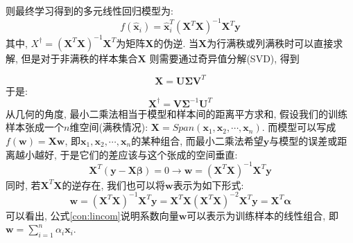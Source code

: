 则最终学习得到的多元线性回归模型为:
\begin{equation}
f\left( \boldsymbol{\hat{x}}_i \right) =\boldsymbol{\hat{x}}_{i}^{T}\left( \mathbf{X}^T\mathbf{X} \right) ^{-1}\mathbf{X}^T\mathbf{y}
\end{equation}
其中, $X^{\dag} = (\mathbf{X}^T\mathbf{X} )^{-1}\mathbf{X}^T$为矩阵$\mathbf{X} $的伪逆.  当$\mathbf{X} $为行满秩或列满秩时可以直接求解, 但是对于非满秩的样本集合$\mathbf{X} $ 则需要通过奇异值分解(SVD), 得到

\begin{equation}
\mathbf{X}=\mathbf{U\Sigma V}^T
\end{equation}
于是:
\begin{equation}
\mathbf{X}^{\dag}=\mathbf{V\Sigma }^{-1}\mathbf{U}^T
\end{equation}
从几何的角度, 最小二乘法相当于模型和样本间的距离平方求和, 假设我们的训练样本张成一个$n$维空间(满秩情况): $\mathbf{X}=Span\left( \boldsymbol{x}_1,\boldsymbol{x}_2,\cdots ,\boldsymbol{x}_n \right) $. 而模型可以写成$f\left( \boldsymbol{w} \right) =\mathbf{X}\boldsymbol{w}$, 即$\boldsymbol{x}_1,\boldsymbol{x}_2,\cdots ,\boldsymbol{x}_n$的某种组合, 而最小二乘法希望$\mathbf{y}$与模型的误差或距离越小越好, 于是它们的差应该与这个张成的空间垂直:
\begin{equation}
\mathbf{X}^T\left( \mathbf{y}-\mathbf{X}\boldsymbol{\beta } \right) =0\rightarrow \boldsymbol{w }=\left( \mathbf{X}^T\mathbf{X} \right) ^{-1}\mathbf{X}^T\mathbf{y}
\end{equation}
同时, 若$\mathbf{X}^T\mathbf{X}$的逆存在, 我们也可以将$\boldsymbol{w}$表示为如下形式:
\begin{equation}
\boldsymbol{w}=\left( \mathbf{X}^T\mathbf{X} \right) ^{-1}\mathbf{X}^T\mathbf{y}=\mathbf{X}^T\mathbf{X}\left( \mathbf{X}^T\mathbf{X} \right) ^{-2}\mathbf{X}^T\mathbf{y}=\mathbf{X}^T\boldsymbol{\alpha } \label{con:lincom}
\end{equation}
可以看出, 公式\eqref{con:lincom}说明系数向量$\boldsymbol{w}$可以表示为训练样本的线性组合, 即$\boldsymbol{w}=\sum_{i=1}^n{\alpha _i\boldsymbol{x}_i}$.





